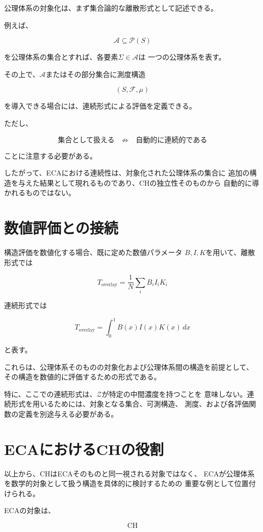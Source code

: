 \documentclass[12pt,a4paper]{article}
\begin{document}
公理体系の対象化は、まず集合論的な離散形式として記述できる。

例えば、

\[
\mathscr{A}\subseteq\mathcal{P}(S)
\]

を公理体系の集合とすれば、各要素$\Sigma\in\mathscr{A}$は
一つの公理体系を表す。

その上で、$\mathscr{A}$またはその部分集合に測度構造

\[
(S,\mathcal{F},\mu)
\]

を導入できる場合には、連続形式による評価を定義できる。

ただし、

\[
\text{集合として扱える}
\quad\not\Rightarrow\quad
\text{自動的に連続的である}
\]

ことに注意する必要がある。

したがって、ECAにおける連続性は、対象化された公理体系の集合に
追加の構造を与えた結果として現れるものであり、CHの独立性そのものから
自動的に導かれるものではない。

\section{数値評価との接続}

構造評価を数値化する場合、既に定めた数値パラメータ
$B,I,K$を用いて、離散形式では

\[
T_{\mathrm{overlay}}
=
\frac{1}{N}
\sum_i B_iI_iK_i
\]

連続形式では

\[
T_{\mathrm{overlay}}
=
\int_0^1B(x)I(x)K(x)\,dx
\]

と表す。

これらは、公理体系そのものの対象化および公理体系間の構造を前提として、
その構造を数値的に評価するための形式である。

特に、ここでの連続形式は、$\mathcal{Z}$が特定の中間濃度を持つことを
意味しない。連続形式を用いるためには、対象となる集合、可測構造、
測度、および各評価関数の定義を別途与える必要がある。

\section{ECAにおけるCHの役割}

以上から、CHはECAそのものと同一視される対象ではなく、
ECAが公理体系を数学的対象として扱う構造を具体的に検討するための
重要な例として位置付けられる。

ECAの対象は、

\[
\text{CH}
\]
\end{document}
